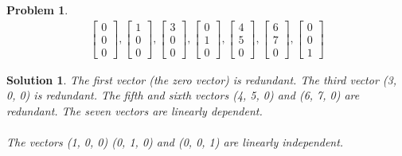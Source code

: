 \documentclass{article}
\newtheorem{problem}{Problem}
\newtheorem*{solution}{Solution}
\begin{document}
\begin{problem}
\begin{align*}
\begin{bmatrix} 0 \\ 0 \\ 0 \end{bmatrix}, 
\begin{bmatrix} 1 \\ 0 \\ 0 \end{bmatrix},
\begin{bmatrix} 3 \\ 0 \\ 0 \end{bmatrix},
\begin{bmatrix} 0 \\ 1 \\ 0 \end{bmatrix}, 
\begin{bmatrix} 4 \\ 5 \\ 0 \end{bmatrix},
\begin{bmatrix} 6 \\ 7 \\ 0 \end{bmatrix},
\begin{bmatrix} 0 \\ 0 \\ 1 \end{bmatrix}
\end{align*}
\end{problem}

\begin{solution}
The first vector (the zero vector) is redundant. The third vector (3, 0, 0) is redundant. The fifth and sixth vectors (4, 5, 0) and (6, 7, 0) are redundant. The seven vectors are linearly dependent.\\
\\
The vectors (1, 0, 0) (0, 1, 0) and (0, 0, 1) are linearly independent.
\end{solution}
\end{document}
